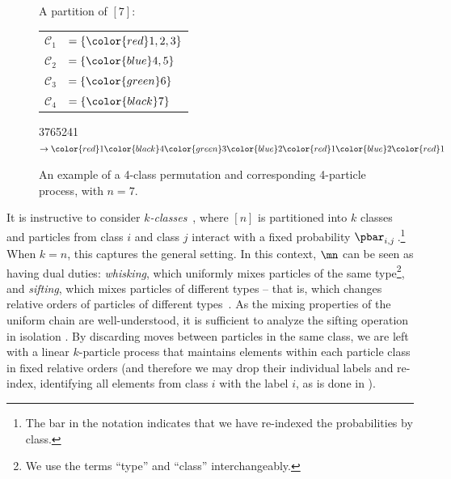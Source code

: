 \documentclass{toc}
\begin{document}
\begin{figure}[htb]
  \centering
       \begin{minipage}[c]{.5\textwidth}
     \centering
     {\footnotesize
     A partition of $[7]$:
     \begin{tabular}{rl}
     $\mathcal{C}_1$ & $= \{{\color{red} 1,2,3}\}$\\
      $\mathcal{C}_2$ & $= \{{\color{blue} 4,5}\}$\\
      $\mathcal{C}_3$ & $= \{{\color{green} 6}\}$\\
       $\mathcal{C}_4$ & $= \{{\color{black} 7}\}$\\
     
     \end{tabular}}
     \end{minipage}\hfill
          \begin{minipage}[c]{.5\textwidth}
     \centering
           \newcommand{\one}{{\color{red}1}}
           \newcommand{\two}{{\color{blue}2}}
           \newcommand{\three}{{\color{green}3}}

          \newcommand{\four}{{\color{black}4}}

    {\color{red} 3}{\color{black}7}{\color{green}6}{\color{blue}5}{\color{red}2}{\color{blue}4}{\color{red}1} $\rightarrow \one \four \three \two \one\two\one$\\
    
       \end{minipage}\hfill
      \caption{An example of a 4-class permutation and corresponding 4-particle process, with $n=7$.}
\label{fig:Particle}
\end{figure}

It is instructive to consider \emph{$k$-classes}~\cite{MS}, where $[n]$ 
is partitioned into $k$ classes and particles from class $i$ and class 
$j$ interact with a fixed probability
%
%
$\pbar_{i,j}\,$.\footnote{The bar in   %
the notation indicates that we have re-indexed the probabilities by 
class.} %
When $k=n$, this captures the general setting. In this 
context, $\mn$ can be seen as having dual duties: \emph{whisking}, 
which uniformly mixes particles of the same type\footnote{We use the 
terms ``type'' and ``class'' interchangeably.}, and \emph{sifting}, 
which mixes particles of different types %
-- that is, which changes relative orders of particles of different types~\cite{HW16}. %
%
As the mixing properties of the uniform chain are well-understood, it is 
sufficient to analyze the sifting operation in
%
%
isolation \cite{HW16, MS}.  %
By discarding moves between particles in the same class, we are 
left with a linear $k$-particle process that maintains elements within 
each particle class in fixed relative orders (and therefore we may drop 
their individual labels and re-index, identifying all elements from 
class $i$ with the label $i$, as is done in ).
\end{document}

